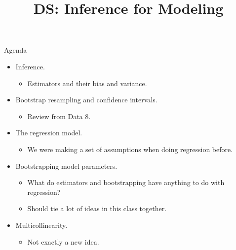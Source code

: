 \documentclass[aspectratio=169]{../latex_main/tntbeamer}  %
\title[Introduction]{DS: Inference for Modeling}
\subtitle{}
\begin{document}
	
	\maketitle
	\begin{frame}{Agenda}
	    \begin{itemize}
	        \item Inference.
	        \begin{itemize}
	            \item Estimators and their bias and variance.
	        \end{itemize}
	        \item Bootstrap resampling and confidence intervals.
	        \begin{itemize}
	            \item Review from Data 8.
	        \end{itemize}
	        \item The regression model.
	        \begin{itemize}
	            \item We were making a set of assumptions when doing regression before.
	        \end{itemize}
	        \item Bootstrapping model parameters.
	        \begin{itemize}
	            \item What do estimators and bootstrapping have anything to do with regression?
	            \item Should tie a lot of ideas in this class together.
	        \end{itemize}
	        \item Multicollinearity.
	        \begin{itemize}
	            \item Not exactly a new idea.
	        \end{itemize}
	    \end{itemize}
	\end{frame}
	
	
\end{document}
